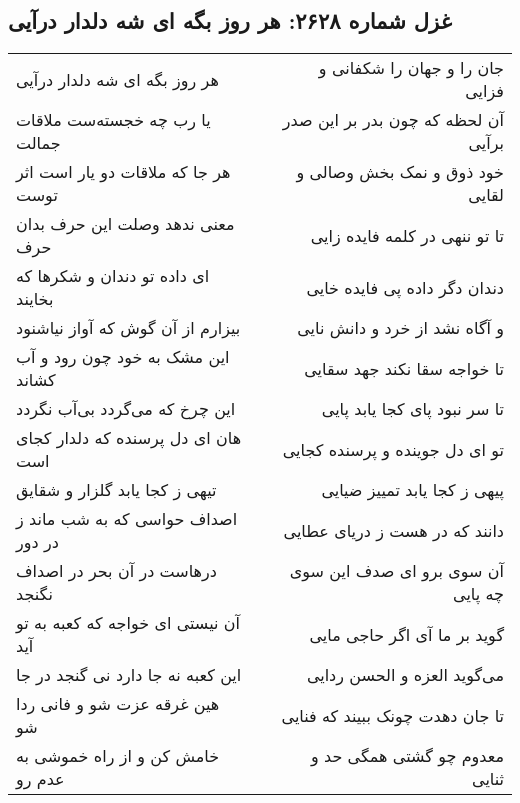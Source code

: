 \begin{center}
\section*{غزل شماره ۲۶۲۸: هر روز بگه ای شه دلدار درآیی}
\label{sec:2628}
\begin{longtable}{l p{0.5cm} r}
هر روز بگه ای شه دلدار درآیی
&&
جان را و جهان را شکفانی و فزایی
\\
یا رب چه خجسته‌ست ملاقات جمالت
&&
آن لحظه که چون بدر بر این صدر برآیی
\\
هر جا که ملاقات دو یار است اثر توست
&&
خود ذوق و نمک بخش وصالی و لقایی
\\
معنی ندهد وصلت این حرف بدان حرف
&&
تا تو ننهی در کلمه فایده زایی
\\
ای داده تو دندان و شکرها که بخایند
&&
دندان دگر داده پی فایده خایی
\\
بیزارم از آن گوش که آواز نیاشنود
&&
و آگاه نشد از خرد و دانش نایی
\\
این مشک به خود چون رود و آب کشاند
&&
تا خواجه سقا نکند جهد سقایی
\\
این چرخ که می‌گردد بی‌آب نگردد
&&
تا سر نبود پای کجا یابد پایی
\\
هان ای دل پرسنده که دلدار کجای است
&&
تو ای دل جوینده و پرسنده کجایی
\\
تیهی ز کجا یابد گلزار و شقایق
&&
پیهی ز کجا یابد تمییز ضیایی
\\
اصداف حواسی که به شب ماند ز در دور
&&
دانند که در هست ز دریای عطایی
\\
درهاست در آن بحر در اصداف نگنجد
&&
آن سوی برو ای صدف این سوی چه پایی
\\
آن نیستی ای خواجه که کعبه به تو آید
&&
گوید بر ما آی اگر حاجی مایی
\\
این کعبه نه جا دارد نی گنجد در جا
&&
می‌گوید العزه و الحسن ردایی
\\
هین غرقه عزت شو و فانی ردا شو
&&
تا جان دهدت چونک ببیند که فنایی
\\
خامش کن و از راه خموشی به عدم رو
&&
معدوم چو گشتی همگی حد و ثنایی
\\
\end{longtable}
\end{center}

